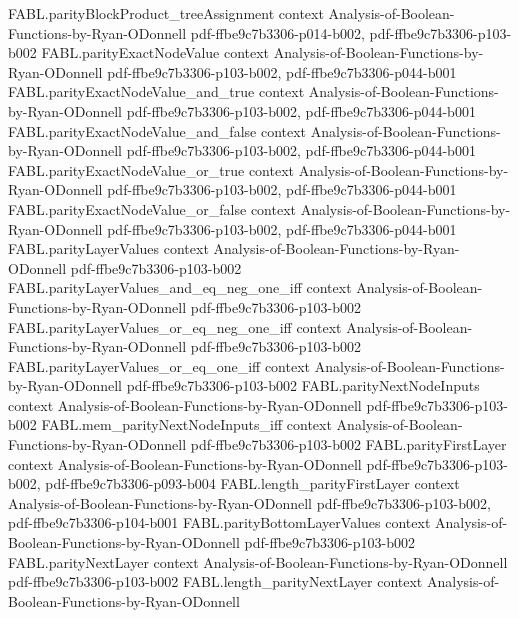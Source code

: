 \begin{theorem}
\proofstep
  {FABL.parityBlockProduct_treeAssignment}
  {context}
  {Analysis-of-Boolean-Functions-by-Ryan-ODonnell}
  {pdf-ffbe9c7b3306-p014-b002,
    pdf-ffbe9c7b3306-p103-b002}
\proofstep
  {FABL.parityExactNodeValue}
  {context}
  {Analysis-of-Boolean-Functions-by-Ryan-ODonnell}
  {pdf-ffbe9c7b3306-p103-b002,
    pdf-ffbe9c7b3306-p044-b001}
\proofstep
  {FABL.parityExactNodeValue_and_true}
  {context}
  {Analysis-of-Boolean-Functions-by-Ryan-ODonnell}
  {pdf-ffbe9c7b3306-p103-b002,
    pdf-ffbe9c7b3306-p044-b001}
\proofstep
  {FABL.parityExactNodeValue_and_false}
  {context}
  {Analysis-of-Boolean-Functions-by-Ryan-ODonnell}
  {pdf-ffbe9c7b3306-p103-b002,
    pdf-ffbe9c7b3306-p044-b001}
\proofstep
  {FABL.parityExactNodeValue_or_true}
  {context}
  {Analysis-of-Boolean-Functions-by-Ryan-ODonnell}
  {pdf-ffbe9c7b3306-p103-b002,
    pdf-ffbe9c7b3306-p044-b001}
\proofstep
  {FABL.parityExactNodeValue_or_false}
  {context}
  {Analysis-of-Boolean-Functions-by-Ryan-ODonnell}
  {pdf-ffbe9c7b3306-p103-b002,
    pdf-ffbe9c7b3306-p044-b001}
\proofstep
  {FABL.parityLayerValues}
  {context}
  {Analysis-of-Boolean-Functions-by-Ryan-ODonnell}
  {pdf-ffbe9c7b3306-p103-b002}
\proofstep
  {FABL.parityLayerValues_and_eq_neg_one_iff}
  {context}
  {Analysis-of-Boolean-Functions-by-Ryan-ODonnell}
  {pdf-ffbe9c7b3306-p103-b002}
\proofstep
  {FABL.parityLayerValues_or_eq_neg_one_iff}
  {context}
  {Analysis-of-Boolean-Functions-by-Ryan-ODonnell}
  {pdf-ffbe9c7b3306-p103-b002}
\proofstep
  {FABL.parityLayerValues_or_eq_one_iff}
  {context}
  {Analysis-of-Boolean-Functions-by-Ryan-ODonnell}
  {pdf-ffbe9c7b3306-p103-b002}
\proofstep
  {FABL.parityNextNodeInputs}
  {context}
  {Analysis-of-Boolean-Functions-by-Ryan-ODonnell}
  {pdf-ffbe9c7b3306-p103-b002}
\proofstep
  {FABL.mem_parityNextNodeInputs_iff}
  {context}
  {Analysis-of-Boolean-Functions-by-Ryan-ODonnell}
  {pdf-ffbe9c7b3306-p103-b002}
\proofstep
  {FABL.parityFirstLayer}
  {context}
  {Analysis-of-Boolean-Functions-by-Ryan-ODonnell}
  {pdf-ffbe9c7b3306-p103-b002,
    pdf-ffbe9c7b3306-p093-b004}
\proofstep
  {FABL.length_parityFirstLayer}
  {context}
  {Analysis-of-Boolean-Functions-by-Ryan-ODonnell}
  {pdf-ffbe9c7b3306-p103-b002,
    pdf-ffbe9c7b3306-p104-b001}
\proofstep
  {FABL.parityBottomLayerValues}
  {context}
  {Analysis-of-Boolean-Functions-by-Ryan-ODonnell}
  {pdf-ffbe9c7b3306-p103-b002}
\proofstep
  {FABL.parityNextLayer}
  {context}
  {Analysis-of-Boolean-Functions-by-Ryan-ODonnell}
  {pdf-ffbe9c7b3306-p103-b002}
\proofstep
  {FABL.length_parityNextLayer}
  {context}
  {Analysis-of-Boolean-Functions-by-Ryan-ODonnell}

\end{theorem}

